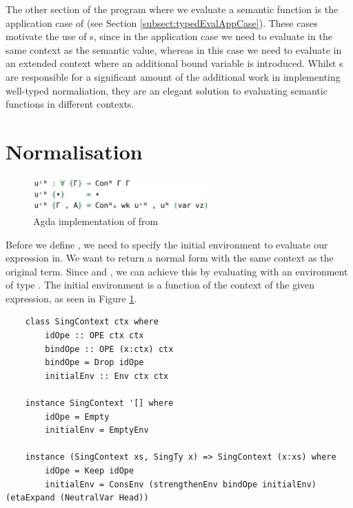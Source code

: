 The other section of the program where we evaluate a semantic function  is the application case of  (see Section \ref{subsect:typedEvalAppCase}). These cases motivate the use of s, since in the application case we need to evaluate  in the same context as the semantic value, whereas in this case we need to evaluate  in an extended context where an additional bound variable is introduced. Whilst s are responsible for a significant amount of the additional work in implementing well-typed normaliation, they are an elegant solution to evaluating semantic functions in different contexts.



\section{Normalisation}

\begin{figure}[h]
    \centering
    \includegraphics[width=0.6\textwidth]{./images/agda_initial_env.png}
    \caption{Agda implementation of  from \cite{AgdaNbe}}
    \label{fig:agdaInitialEnv}
\end{figure}

Before we define , we need to specify the initial environment to evaluate our expression in. We want  to return a normal form with the same context as the original term. Since  and , we can achieve this by evaluating with an environment of type . The initial environment is a function of the context of the given expression, as seen in Figure \ref{fig:agdaInitialEnv}.

\begin{lstlisting}
    class SingContext ctx where
        idOpe :: OPE ctx ctx
        bindOpe :: OPE (x:ctx) ctx
        bindOpe = Drop idOpe
        initialEnv :: Env ctx ctx

    instance SingContext '[] where
        idOpe = Empty
        initialEnv = EmptyEnv

    instance (SingContext xs, SingTy x) => SingContext (x:xs) where
        idOpe = Keep idOpe
        initialEnv = ConsEnv (strengthenEnv bindOpe initialEnv) (etaExpand (NeutralVar Head))
\end{lstlisting}

